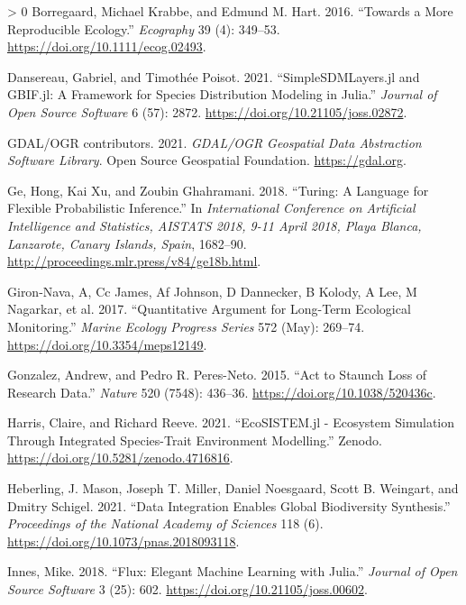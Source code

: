\documentclass[10pt,oneside]{article}
\newlength{\cslhangindent}
\newenvironment{CSLReferences}[3] %
 {%
  \setlength{\parindent}{0pt}
  \ifodd #1 \everypar{\setlength{\hangindent}{\cslhangindent}}\ignorespaces\fi
  \ifnum #2 > 0
  \setlength{\parskip}{#2\baselineskip}
  \fi
 }%
 {}
\begin{document}
\hypertarget{refs}{}
\begin{CSLReferences}{1}{0}
\leavevmode\hypertarget{ref-Borregaard2016MorRep}{}%
Borregaard, Michael Krabbe, and Edmund M. Hart. 2016. {``Towards a More
Reproducible Ecology.''} \emph{Ecography} 39 (4): 349--53.
\url{https://doi.org/10.1111/ecog.02493}.

\leavevmode\hypertarget{ref-Dansereau2021SimJl}{}%
Dansereau, Gabriel, and Timothée Poisot. 2021. {``SimpleSDMLayers.jl and
GBIF.jl: A Framework for Species Distribution Modeling in Julia.''}
\emph{Journal of Open Source Software} 6 (57): 2872.
\url{https://doi.org/10.21105/joss.02872}.

\leavevmode\hypertarget{ref-GDAL}{}%
GDAL/OGR contributors. 2021. \emph{GDAL/OGR Geospatial Data Abstraction
Software Library}. Open Source Geospatial Foundation.
\url{https://gdal.org}.

\leavevmode\hypertarget{ref-Turing}{}%
Ge, Hong, Kai Xu, and Zoubin Ghahramani. 2018. {``Turing: A Language for
Flexible Probabilistic Inference.''} In \emph{International Conference
on Artificial Intelligence and Statistics, AISTATS 2018, 9-11 April
2018, Playa Blanca, Lanzarote, Canary Islands, Spain}, 1682--90.
\url{http://proceedings.mlr.press/v84/ge18b.html}.

\leavevmode\hypertarget{ref-Giron-Nava2017QuaArg}{}%
Giron-Nava, A, Cc James, Af Johnson, D Dannecker, B Kolody, A Lee, M
Nagarkar, et al. 2017. {``Quantitative Argument for Long-Term Ecological
Monitoring.''} \emph{Marine Ecology Progress Series} 572 (May): 269--74.
\url{https://doi.org/10.3354/meps12149}.

\leavevmode\hypertarget{ref-Gonzalez2015ActSta}{}%
Gonzalez, Andrew, and Pedro R. Peres-Neto. 2015. {``Act to Staunch Loss
of Research Data.''} \emph{Nature} 520 (7548): 436--36.
\url{https://doi.org/10.1038/520436c}.

\leavevmode\hypertarget{ref-Harris2021EcoJl}{}%
Harris, Claire, and Richard Reeve. 2021. {``EcoSISTEM.jl - Ecosystem
Simulation Through Integrated Species-Trait Environment Modelling.''}
Zenodo. \url{https://doi.org/10.5281/zenodo.4716816}.

\leavevmode\hypertarget{ref-Heberling2021DatInt}{}%
Heberling, J. Mason, Joseph T. Miller, Daniel Noesgaard, Scott B.
Weingart, and Dmitry Schigel. 2021. {``Data Integration Enables Global
Biodiversity Synthesis.''} \emph{Proceedings of the National Academy of
Sciences} 118 (6). \url{https://doi.org/10.1073/pnas.2018093118}.

\leavevmode\hypertarget{ref-Innes2018FluEle}{}%
Innes, Mike. 2018. {``Flux: Elegant Machine Learning with Julia.''}
\emph{Journal of Open Source Software} 3 (25): 602.
\url{https://doi.org/10.21105/joss.00602}.


\end{CSLReferences}
\end{document}
